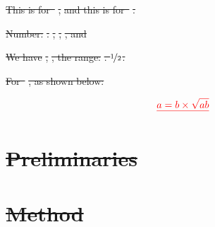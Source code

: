 \documentclass{amsart}
\providecommand{\DIFdel}[1]{{\protect\color{red}\sout{#1}}}                      %
\begin{document}
\DIFdel{This is for~}%
\DIFdel{, 
}%
\DIFdel{and this is for~}%
\DIFdel{.
}%

\DIFdel{Number: }%
\DIFdel{.
}%
\DIFdel{, }%
\DIFdel{,
}%
\DIFdel{,
and }%


\DIFdel{We have }%
\DIFdel{,
	}%
\DIFdel{,
	the range: }%
\DIFdel{.
$\nicefrac[]{1}{2}$.
	}%



\DIFdel{For~}%
\DIFdel{,
as shown below:
}%

\begin{displaymath}\DIFdel{%
	a = b \times \sqrt{ab}
}\end{displaymath}%


\section{\DIFdel{Preliminaries}} %
\addtocounter{section}{-1}%



\section{\DIFdel{Method}} %
\addtocounter{section}{-1}%
\end{document}
